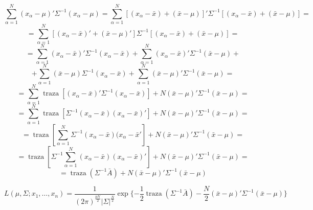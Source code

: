 \documentclass[11pt,a4paper]{article}
\begin{document}
\begin{itemize}
$$\sum_{\alpha=1}^{N} (x_{\alpha}-\mu)' \Sigma^{-1} (x_{\alpha}-\mu) = \sum_{\alpha=1}^{N}[(x_{\alpha}-\bar{x}) + (\bar{x}-\mu)]' \Sigma^{-1} [(x_{\alpha}-\bar{x}) + (\bar{x} - \mu)] =$$
$$= \sum_{\alpha=1}^{N} [(x_{\alpha} - \bar{x})' + (\bar{x}-\mu)'] \Sigma^{-1} [(x_{\alpha} - \bar{x}) + (\bar{x} - \mu)] =$$
$$= \sum_{\alpha=1}^{N} (x_{\alpha} - \bar{x})' \Sigma^{-1} (x_{\alpha} - \bar{x}) + \sum_{\alpha=1}^{N}(x_{\alpha}-\bar{x})' \Sigma^{-1}(\bar{x}-\mu) +$$
$$+ \sum_{\alpha=1}^{N} (\bar{x}-\mu) \Sigma^{-1} (x_{\alpha} - \bar{x}) + \sum_{\alpha=1}^{N} (\bar{x}-\mu)' \Sigma^{-1} (\bar{x}-\mu) =$$
$$= \sum_{\alpha=1}^{N} \operatorname{traza}[(x_{\alpha} - \bar{x})' \Sigma^{-1} (x_{\alpha} - \bar{x})] + N(\bar{x}-\mu)' \Sigma^{-1} (\bar{x}-\mu) =$$
$$= \sum_{\alpha=1}^{N} \operatorname{traza} [\Sigma^{-1}(x_{\alpha} - \bar{x})(x_{\alpha} - \bar{x})'] + N(\bar{x} - \mu)' \Sigma^{-1} (\bar{x}-\mu) =$$
$$= \operatorname{traza}[\sum_{\alpha=1}^{N} \Sigma^{-1}(x_{\alpha} - \bar{x}) (x_{\alpha} - \bar{x}'] + N(\bar{x} - \mu)' \Sigma^{-1} (\bar{x}-\mu) =$$
$$= \operatorname{traza}[\Sigma^{-1} \sum_{\alpha=1}^{N} (x_{\alpha} - \bar{x})(x_{\alpha} - \bar{x})'] + N(\bar{x}-\mu)' \Sigma^{-1} (\bar{x}-\mu) =$$
$$= \operatorname{traza}(\Sigma^{-1}\bar{A}) + N(\bar{x}-\mu)' \Sigma^{-1} (\bar{x}-\mu)$$

$$L(\mu, \Sigma; x_{1}, \dots, x_{n}) = \frac{1}{(2\pi)^{\frac{pN}{2}}|\Sigma|^{\frac{N}{2}}} \operatorname{exp}\{-\frac{1}{2} \operatorname{traza}(\Sigma^{-1}\bar{A}) - \frac{N}{2}(\bar{x}-\mu)' \Sigma^{-1} (\bar{x}-\mu)\}$$
 
\end{itemize}
\end{document}
